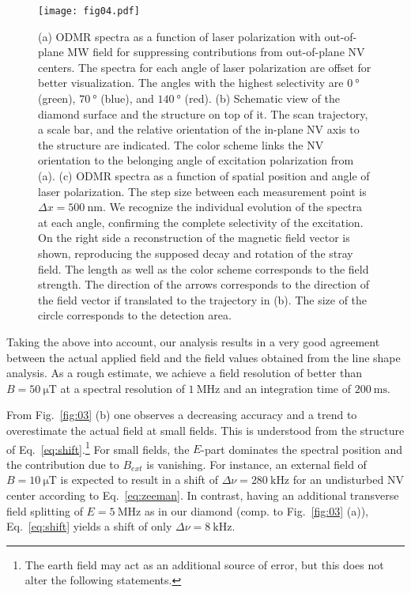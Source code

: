 \documentclass[
 reprint,
 amsmath,
 amssymb,
aps,
 prb,
showpacs
]{revtex4-1}
\begin{document}
\begin{figure*}[t]
\texttt{[image: fig04.pdf]}
\caption{(a) ODMR spectra as a function of laser polarization with out-of-plane MW field for suppressing contributions from out-of-plane NV centers. The spectra for each angle of laser polarization are offset for better visualization. The angles with the highest selectivity are $\SI{0}{\degree}$ (green), $\SI{70}{\degree}$ (blue), and $\SI{140}{\degree}$ (red). (b) Schematic view of the diamond surface and the structure on top of it. The scan trajectory, a scale bar, and the relative orientation of the in-plane NV axis to the structure are indicated. The color scheme links the NV orientation to the belonging angle of excitation polarization from (a). (c) ODMR spectra as a function of spatial position and angle of laser polarization. The step size between each measurement point is $\Delta x = \SI{500}{\nano\meter}$. We recognize the individual evolution of the spectra at each angle, confirming the complete selectivity of the excitation. On the right side a reconstruction of the magnetic field vector is shown, reproducing the supposed decay and rotation of the stray field. The length as well as the color scheme corresponds to the field strength. The direction of the arrows corresponds to the direction of the field vector if translated to the trajectory in (b). The size of the circle corresponds to the detection area.}
\label{fig:04}
\end{figure*}

Taking the above into account, our analysis results in a very good agreement between the actual applied field and the field values obtained from the line shape analysis. As a rough estimate, we achieve a field resolution of better than $B = \SI{50}{\micro\tesla}$ at a spectral resolution of $\SI{1}{\mega\hertz}$ and an integration time of $\SI{200}{\milli\second}$. 

From Fig.~\ref{fig:03} (b) one observes a decreasing accuracy and a trend to overestimate the actual field at small fields. This is understood from the structure of Eq.~\ref{eq:shift}.\footnote{The earth field may act as an additional source of error, but this does not alter the following statements.} For small fields, the $E$-part dominates the spectral position and the contribution due to $B_{ext}$ is vanishing. For instance, an external field of $B = \SI{10}{\micro\tesla}$ is expected to result in a shift of $\Delta \nu  = \SI{280}{\kilo\hertz}$ for an undisturbed NV center according to Eq.~\ref{eq:zeeman}. In contrast, having an additional transverse field splitting of $E  = \SI{5}{\mega\hertz}$ as in our diamond (comp. to Fig.~\ref{fig:03} (a)), Eq.~\ref{eq:shift} yields a shift of only $\Delta \nu  = \SI{8}{\kilo\hertz}$.
\end{document}
